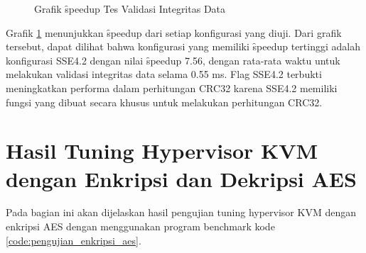 \begin{figure}
    \centering
    \caption{Grafik \f{speedup} Tes Validasi Integritas Data}
    \label{fig:file_integrity_test_graph}
\end{figure}

Grafik \ref{fig:file_integrity_test_graph} menunjukkan \f{speedup} dari setiap konfigurasi yang diuji. Dari grafik tersebut, dapat dilihat bahwa konfigurasi yang memiliki \f{speedup} tertinggi adalah konfigurasi SSE4.2 dengan nilai \f{speedup} 7.56, dengan rata-rata waktu untuk melakukan validasi integritas data selama 0.55 ms. Flag SSE4.2 terbukti meningkatkan performa dalam perhitungan CRC32 karena SSE4.2 memiliki fungsi yang dibuat secara khusus untuk melakukan perhitungan CRC32.

\section{Hasil Tuning Hypervisor KVM dengan Enkripsi dan Dekripsi AES}
Pada bagian ini akan dijelaskan hasil pengujian tuning hypervisor KVM dengan enkripsi AES dengan menggunakan program benchmark kode \ref{code:pengujian_enkripsi_aes}.

